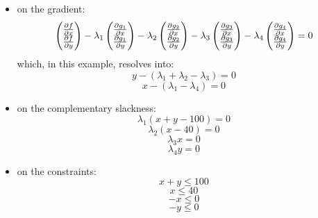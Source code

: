  \begin{itemize}
  \item on the gradient:
  \[
    \begin{pmatrix}\pdv{f}{x}\\\pdv{f}{y}\end{pmatrix} 
    -\lambda_1 \begin{pmatrix}\pdv{g_1}{x}\\\pdv{g_1}{y}\end{pmatrix}
    -\lambda_2 \begin{pmatrix}\pdv{g_2}{x}\\\pdv{g_2}{y}\end{pmatrix} 
    -\lambda_3 \begin{pmatrix}\pdv{g_3}{x}\\\pdv{g_3}{y}\end{pmatrix}
    -\lambda_4 \begin{pmatrix}\pdv{g_4}{x}\\\pdv{g_4}{y}\end{pmatrix}=0
  \]
  which, in this example, resolves into:
  \begin{equation}\label{Eq:KKT1}y-(\lambda_1+\lambda_2-\lambda_3)=0\end{equation}
  \begin{equation}\label{Eq:KKT2}x-(\lambda_1-\lambda_4)=0\end{equation}
  \item on the complementary slackness:
  \begin{equation}\label{Eq:KKT3}\lambda_1 (x +y -100)=0\end{equation}
  \begin{equation}\label{Eq:KKT4}\lambda_2 (x-40)=0\end{equation}
  \begin{equation}\label{Eq:KKT5}\lambda_3 x =0\end{equation}
  \begin{equation}\label{Eq:KKT6}\lambda_4 y =0\end{equation}
  \item on the constraints:
  \begin{equation}\label{Eq:KKT7}x+ y \leq100\end{equation}
  \begin{equation}\label{Eq:KKT8}x\leq40\end{equation}
  \begin{equation}\label{Eq:KKT9}-x\leq0\end{equation}
  \begin{equation}\label{Eq:KKT10}-y\leq0\end{equation}


\end{itemize}
